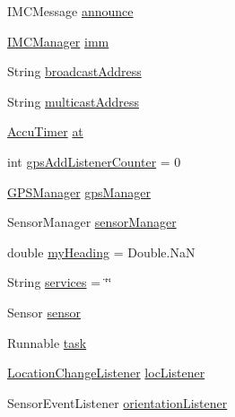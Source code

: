 \begin{DoxyCompactItemize}
\item 
I\+M\+C\+Message \hyperlink{classpt_1_1lsts_1_1asa_1_1comms_1_1Announcer_ac313418f572f98ec1f2ea28f46a46451}{announce}
\item 
\hyperlink{classpt_1_1lsts_1_1asa_1_1managers_1_1IMCManager}{I\+M\+C\+Manager} \hyperlink{classpt_1_1lsts_1_1asa_1_1comms_1_1Announcer_a899369bb5523890384993f85eea10fdd}{imm}
\item 
String \hyperlink{classpt_1_1lsts_1_1asa_1_1comms_1_1Announcer_a849ac220046482feb3bbc0a3ce2e8767}{broadcast\+Address}
\item 
String \hyperlink{classpt_1_1lsts_1_1asa_1_1comms_1_1Announcer_ac2278bc6a01e42484ffbd47efbe575e3}{multicast\+Address}
\item 
\hyperlink{classpt_1_1lsts_1_1asa_1_1util_1_1AccuTimer}{Accu\+Timer} \hyperlink{classpt_1_1lsts_1_1asa_1_1comms_1_1Announcer_ab58beeb4d4dcf2157e94042a7d27f8ac}{at}
\item 
int \hyperlink{classpt_1_1lsts_1_1asa_1_1comms_1_1Announcer_a6c6423b8c761aca8f7b0063bb2e18635}{gps\+Add\+Listener\+Counter} = 0
\item 
\hyperlink{classpt_1_1lsts_1_1asa_1_1managers_1_1GPSManager}{G\+P\+S\+Manager} \hyperlink{classpt_1_1lsts_1_1asa_1_1comms_1_1Announcer_a08b04d9ec24009895e3f19671bf92e55}{gps\+Manager}
\item 
Sensor\+Manager \hyperlink{classpt_1_1lsts_1_1asa_1_1comms_1_1Announcer_a78ba041e6948dffe1bf29e0f9eb74d5b}{sensor\+Manager}
\item 
double \hyperlink{classpt_1_1lsts_1_1asa_1_1comms_1_1Announcer_a12bf9859e53e247eea25e7d1428ce942}{my\+Heading} = Double.\+Na\+N
\item 
String \hyperlink{classpt_1_1lsts_1_1asa_1_1comms_1_1Announcer_ad98caa0827d953121f9ac5e8e79178b4}{services} = \char`\"{}\char`\"{}
\item 
Sensor \hyperlink{classpt_1_1lsts_1_1asa_1_1comms_1_1Announcer_afab33815ef31c419af79ffc274c59030}{sensor}
\item 
Runnable \hyperlink{classpt_1_1lsts_1_1asa_1_1comms_1_1Announcer_a95133bcfa573e3178268dc3b05cbe131}{task}
\item 
\hyperlink{interfacept_1_1lsts_1_1asa_1_1listenners_1_1LocationChangeListener}{Location\+Change\+Listener} \hyperlink{classpt_1_1lsts_1_1asa_1_1comms_1_1Announcer_a3e5ba0512f5ecc6368c17edf3143cd2b}{loc\+Listener}
\item 
Sensor\+Event\+Listener \hyperlink{classpt_1_1lsts_1_1asa_1_1comms_1_1Announcer_a785165a29d4299dd7e5cddf9a656eccd}{orientation\+Listener}
\end{DoxyCompactItemize}


